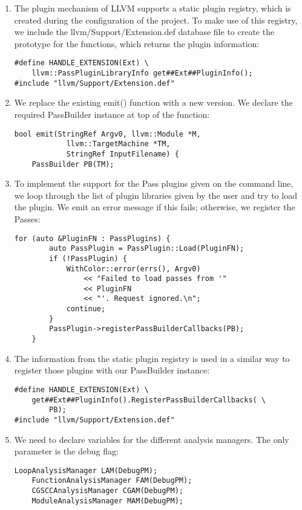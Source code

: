 \begin{enumerate}
\item The plugin mechanism of LLVM supports a static plugin registry, which is created during the configuration of the project. To make use of this registry, we include the llvm/Support/Extension.def database file to create the prototype for the functions, which returns the plugin information:
\begin{lstlisting}[caption={}]
#define HANDLE_EXTENSION(Ext) \
	llvm::PassPluginLibraryInfo get##Ext##PluginInfo();
#include "llvm/Support/Extension.def"
\end{lstlisting}

\item We replace the existing emit() function with a new version. We declare the required PassBuilder instance at top of the function:
\begin{lstlisting}[caption={}]
bool emit(StringRef Argv0, llvm::Module *M,
			llvm::TargetMachine *TM,
			StringRef InputFilename) {
	PassBuilder PB(TM);
\end{lstlisting}

\item To implement the support for the Pass plugins given on the command line, we loop through the list of plugin libraries given by the user and try to load the plugin. We emit an error message if this fails; otherwise, we register the Passes:
\begin{lstlisting}[caption={}]
	for (auto &PluginFN : PassPlugins) {
		auto PassPlugin = PassPlugin::Load(PluginFN);
		if (!PassPlugin) {
			WithColor::error(errs(), Argv0)
				<< "Failed to load passes from '" 
				<< PluginFN
				<< "'. Request ignored.\n";
			continue;
		}
		PassPlugin->registerPassBuilderCallbacks(PB);
	}
\end{lstlisting}

\item The information from the static plugin registry is used in a similar way to register those plugins with our PassBuilder instance:
\begin{lstlisting}[caption={}]
#define HANDLE_EXTENSION(Ext) \
	get##Ext##PluginInfo().RegisterPassBuilderCallbacks( \
		PB);
#include "llvm/Support/Extension.def"
\end{lstlisting}

\item We need to declare variables for the different analysis managers. The only parameter is the debug flag:
\begin{lstlisting}[caption={}]
	LoopAnalysisManager LAM(DebugPM);
	FunctionAnalysisManager FAM(DebugPM);
	CGSCCAnalysisManager CGAM(DebugPM);
	ModuleAnalysisManager MAM(DebugPM);
\end{lstlisting}


\end{enumerate}
